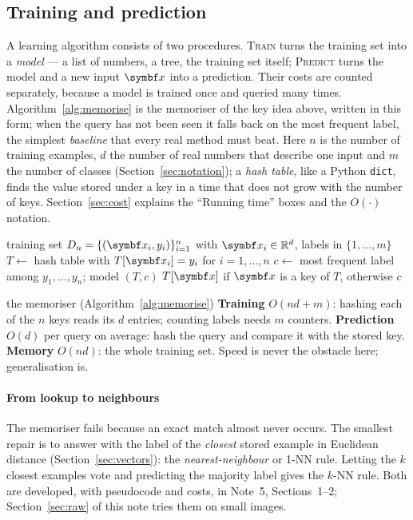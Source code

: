 \documentclass[11pt]{article}
\begin{document}
\subsection{Training and prediction}\label{sec:trainpredict}

A learning algorithm consists of two procedures. \textsc{Train} turns the training set into a \emph{model} --- a
list of numbers, a tree, the training set itself; \textsc{Predict} turns the model and a new input $\x$ into a
prediction. Their costs are counted separately, because a model is trained once and queried many times.
Algorithm~\ref{alg:memorise} is the memoriser of the key idea above, written in this form; when the query has not
been seen it falls back on the most frequent label, the simplest \emph{baseline} that every real method must beat.
Here $n$ is the number of training examples, $d$ the number of real numbers that describe one input and $m$ the
number of classes (Section~\ref{sec:notation}); a \emph{hash table}, like a Python \texttt{dict}, finds the value
stored under a key in a time that does not grow with the number of keys. Section~\ref{sec:cost} explains the
``Running time'' boxes and the $O(\cdot)$ notation.

\begin{algorithm}[htbp]
\caption{The memoriser: a lookup table with a majority-class fallback}\label{alg:memorise}
\begin{algorithmic}[1]
\Require training set $D_n = \{(\x_i, y_i)\}_{i=1}^n$ with $\x_i \in \R^d$, labels in $\{1, \dots, m\}$
  \State $T \gets$ hash table with $T[\x_i] = y_i$ for $i = 1, \dots, n$ 
  \State $c \gets$ most frequent label among $y_1, \dots, y_n$; \Return model $(T, c)$
\EndFunction
{}
  \State \Return $T[\x]$ if $\x$ is a key of $T$, otherwise $c$
\EndFunction
\end{algorithmic}
\end{algorithm}

\begin{runtime}{the memoriser (Algorithm~\ref{alg:memorise})}
\textbf{Training} $O(nd + m)$: hashing each of the $n$ keys reads its $d$ entries; counting labels needs $m$
counters. \textbf{Prediction} $O(d)$ per query on average: hash the query and compare it with the stored key.
\textbf{Memory} $O(nd)$: the whole training set. Speed is never the obstacle here; generalisation is.
\end{runtime}

\paragraph{From lookup to neighbours} The memoriser fails because an exact match almost never occurs. The smallest
repair is to answer with the label of the \emph{closest} stored example in Euclidean distance
(Section~\ref{sec:vectors}): the \emph{nearest-neighbour} or 1-NN rule. Letting the $k$ closest examples vote and
predicting the majority label gives the $k$-NN rule. Both are developed, with pseudocode and costs, in Note~5,
Sections~1--2; Section~\ref{sec:raw} of this note tries them on small images.
\end{document}
